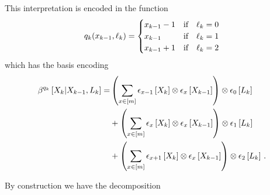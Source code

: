 \begin{example}
    This interpretation is encoded in the function
    \begin{align*}
        q_{k}(x_{k-1},\ell_{k})
        =
        \begin{cases}
            x_{k-1}-1 & \text{if}\quad \ell_{k}=0 \\
            x_{k-1} & \text{if}\quad \ell_{k}=1 \\
            x_{k-1}+1 & \text{if}\quad \ell_{k}=2
        \end{cases}
    \end{align*}
    which has the basis encoding
    \begin{align*}
        \bencodingofat{\exfunctionof{\atomenumerator}}{
            \catvariableof{\catenumerator}
        }[\catvariableof{\catenumerator-1},\selvariableof{\catenumerator}]
        =& \left(\sum_{\catindex\in[\catdim]} \onehotmapofat{\catindex-1}{\catvariableof{\catenumerator}} \otimes \onehotmapofat{\catindex}{\catvariableof{\catenumerator-1}}\right) \otimes \onehotmapofat{0}{\selvariableof{\catenumerator}} \\
        &+ \left(\sum_{\catindex\in[\catdim]} \onehotmapofat{\catindex}{\catvariableof{\catenumerator}} \otimes \onehotmapofat{\catindex}{\catvariableof{\catenumerator-1}}\right) \otimes \onehotmapofat{1}{\selvariableof{\catenumerator}} \\
        &+ \left(\sum_{\catindex\in[\catdim]} \onehotmapofat{\catindex+1}{\catvariableof{\catenumerator}} \otimes \onehotmapofat{\catindex}{\catvariableof{\catenumerator-1}} \right) \otimes \onehotmapofat{2}{\selvariableof{\catenumerator}} \, .
    \end{align*}

    By construction we have the decomposition

\end{example}